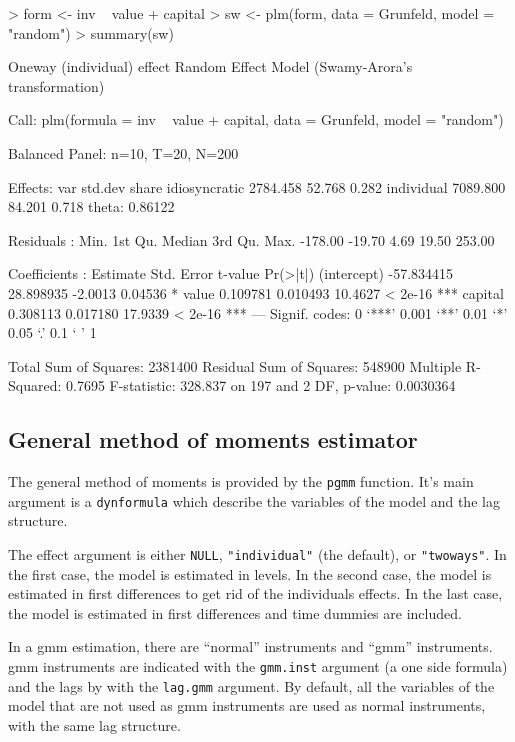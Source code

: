 \documentclass[a4paper]{article}
\begin{document}
\begin{Schunk}
\begin{Sinput}
> form <- inv ~ value + capital
> sw <- plm(form, data = Grunfeld, model = "random")
> summary(sw)
\end{Sinput}
\begin{Soutput}
Oneway (individual) effect Random Effect Model (Swamy-Arora's transformation)

Call:
plm(formula = inv ~ value + capital, data = Grunfeld, model = "random")

Balanced Panel: n=10, T=20, N=200

Effects:
                   var  std.dev share
idiosyncratic 2784.458   52.768 0.282
individual    7089.800   84.201 0.718
theta:  0.86122  

Residuals :
   Min. 1st Qu.  Median 3rd Qu.    Max. 
-178.00  -19.70    4.69   19.50  253.00 

Coefficients :
              Estimate Std. Error t-value Pr(>|t|)    
(intercept) -57.834415  28.898935 -2.0013  0.04536 *  
value         0.109781   0.010493 10.4627  < 2e-16 ***
capital       0.308113   0.017180 17.9339  < 2e-16 ***
---
Signif. codes:  0 ‘***’ 0.001 ‘**’ 0.01 ‘*’ 0.05 ‘.’ 0.1 ‘ ’ 1 

Total Sum of Squares: 2381400
Residual Sum of Squares: 548900
Multiple R-Squared: 0.7695
F-statistic: 328.837 on 197 and 2 DF, p-value: 0.0030364
\end{Soutput}
\end{Schunk}

\subsection{General method of moments estimator}

The general method of moments is provided by the \texttt{pgmm}
function. It's main argument is  a \texttt{dynformula} which describe the variables of the model and the lag structure.


The effect argument is either \texttt{NULL}, \texttt{"individual"} (the default),
or \texttt{"twoways"}. In the first case, the
model is estimated in levels. In the second case, the model is
estimated in first differences to get rid of the individuals
effects. In the last case, the model is estimated in first differences
and time dummies are included. 

In a gmm estimation, there are ``normal'' instruments and ``gmm'' instruments. gmm instruments are indicated with the \texttt{gmm.inst} argument (a one side formula) and the lags by with the \texttt{lag.gmm} argument. By default, all the variables of the model that are not used as gmm instruments are used as normal instruments, with the same lag structure. 
\end{document}
